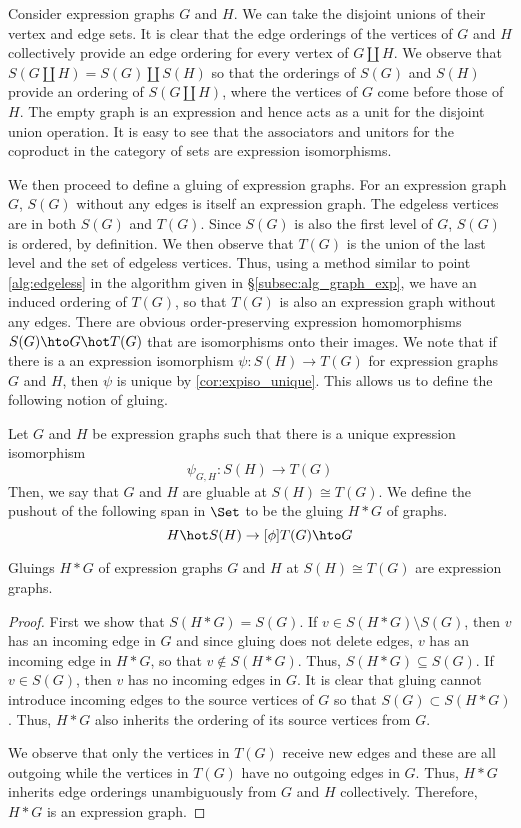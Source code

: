 \documentclass[./Thick_TQFTs_and_Quantum_Information.tex]{subfiles}
\begin{document}
Consider expression graphs $G$ and $H$. We can take the disjoint unions of their
vertex and edge sets. It is clear that the edge orderings of the vertices of
$G$ and $H$ collectively provide an edge ordering for every vertex of
$G \amalg H$. We observe that $S(G \amalg H) = S(G) \amalg S(H)$ so that the
orderings of $S(G)$ and $S(H)$ provide an ordering of $S(G \amalg H)$, where the
vertices of $G$ come before those of $H$. The empty graph is an expression and
hence acts as a unit for the disjoint union operation. It is easy to see that
the associators and unitors for the coproduct in the category of sets are
expression isomorphisms.

We then proceed to define a gluing of expression graphs. For an expression
graph $G$, $S(G)$ without any edges is itself an expression graph.
The edgeless vertices are in both $S(G)$ and $T(G)$. Since $S(G)$ is also the
first level of $G$, $S(G)$ is ordered, by definition. We then observe that
$T(G)$ is the union of the last level and the set of edgeless vertices. Thus,
using a method similar to point \ref{alg:edgeless} in the algorithm given in
\S\ref{subsec:alg_graph_exp}, we have an induced ordering of $T(G)$, so that
$T(G)$ is also an expression graph without any edges.
There are obvious order-preserving expression homomorphisms
$S(G) \hto G \hot T(G)$ that are isomorphisms onto their images. We note
that if there is a an expression isomorphism $\psi : S(H) \to T(G)$ for
expression graphs $G$ and $H$, then $\psi$ is unique by \ref{cor:expiso_unique}.
This allows us to define the following notion of gluing.

\begin{defn}
Let $G$ and $H$ be expression graphs such that there is a unique expression
isomorphism
\[
  \psi_{G, H} : S(H) \to T(G)
\]
Then, we say that $G$ and $H$ are gluable at $S(H) \cong T(G)$. We define the
pushout of the following span in $\Set$ to be the gluing $H * G$ of graphs.
\[
  H \hot S(H) \to[\phi] T(G) \hto G
\]
\end{defn}

\begin{thm}
Gluings $H * G$ of expression graphs $G$ and $H$ at $S(H) \cong T(G)$ are
expression graphs.
\end{thm}
\begin{proof}
First we show that $S(H * G) = S(G)$. If $v \in S(H * G) \setminus S(G)$, then
$v$ has an incoming edge in $G$ and since gluing does not delete edges, $v$ has
an incoming edge in $H * G$, so that $v \not\in S(H * G)$. Thus,
$S(H * G) \subseteq S(G)$. If $v \in S(G)$, then $v$ has no incoming edges in
$G$. It is clear that gluing cannot introduce incoming edges to the source
vertices of $G$ so that $S(G) \subset S(H * G)$. Thus, $H * G$ also inherits the
ordering of its source vertices from $G$.

We observe that only the vertices in $T(G)$ receive new edges and these are all
outgoing while the vertices in $T(G)$ have no outgoing edges in $G$. Thus,
$H * G$ inherits edge orderings unambiguously from $G$ and $H$ collectively.
Therefore, $H * G$ is an expression graph.
\end{proof}
\end{document}
